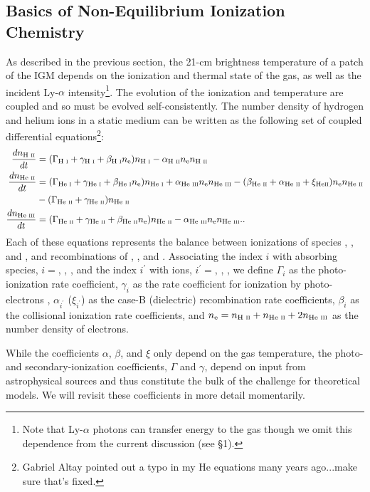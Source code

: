 \subsection{Basics of Non-Equilibrium Ionization Chemistry} \label{sec:ioniz_heating}
As described in the previous section, the 21-cm brightness temperature of a patch of the IGM depends on the ionization and thermal state of the gas, as well as the incident Ly-$\alpha$ intensity\footnote{Note that Ly-$\alpha$ photons can transfer energy to the gas though we omit this dependence from the current discussion (see \S1).}. The evolution of the ionization and temperature are coupled and so must be evolved self-consistently. The number density of hydrogen and helium ions in a static medium can be written as the following set of coupled differential equations\footnote{{\color{red} Gabriel Altay pointed out a typo in my He equations many years ago...make sure that's fixed.}}:
\begin{align}
    \frac{d n_{\text{H } \textsc{ii}}}{dt} & = (\Gamma_{\text{H } \textsc{i}} + \gamma_{\text{H } \textsc{i}} + \beta_{\text{H } \textsc{i}} n_{\text{e}}) n_{\text{H } \textsc{i}} - \alpha_{\text{H } \textsc{ii}} n_{\text{e}} n_{\text{H } \textsc{ii}}   \label{eq:HIIRateEquation} \\
    \frac{d n_{\text{He } \textsc{ii}}}{dt} & = (\Gamma_{\text{He } \textsc{i}} + \gamma_{\text{He } \textsc{i}} + \beta_{\text{He } \textsc{i}} n_{\text{e}}) n_{\text{He } \textsc{i}} \nonumber + \alpha_{\text{He } \textsc{iii}} n_{\text{e}} n_{\text{He } \textsc{iii}}  - (\beta_{\text{He } \textsc{ii}} + \alpha_{\text{He } \textsc{ii}} + \xi_{\text{He} \textsc{ii}}) n_{\text{e}} n_{\text{He } \textsc{ii}} \\ & - (\Gamma_{\text{He } \textsc{ii}} + \gamma_{\text{He } \textsc{ii}}) n_{\text{He } \textsc{ii}} \label{eq:HeIIRateEquation} \\ 
    \frac{d n_{\text{He } \textsc{iii}}}{dt} & = (\Gamma_{\text{He } \textsc{ii}} + \gamma_{\text{He } \textsc{ii}} + \beta_{\text{He } \textsc{ii}} n_{\text{e}}) n_{\text{He } \textsc{ii}}  - \alpha_{\text{He } \textsc{iii}} n_{\text{e}} n_{\text{He } \textsc{iii}} . \label{eq:HeIIIRateEquation} .
\end{align}
Each of these equations represents the balance between ionizations of species
\HI, \HeI, and \HeII, and recombinations of \HII, \HeII, and
\HeIII. Associating the index $i$ with absorbing species, $i = $\HI, \HeI,
\HeII, and the index $i^{\prime}$ with ions, $i^{\prime} = $\HII, \HeII,
\HeIII, we define $\Gamma_i$ as the photo-ionization rate coefficient,
$\gamma_i$ as the rate coefficient for ionization by photo-electrons \cite{Shull1985,Furlanetto2010}, $\alpha_{i^{\prime}}$
($\xi_{i^{\prime}}$) as the case-B (dielectric) recombination rate
coefficients, $\beta_i$ as the collisional ionization rate coefficients, and
$n_{\text{e}} = n_{\text{H } \textsc{ii}} + n_{\text{He } \textsc{ii}} + 2n_{\text{He } \textsc{iii}}$ as the number density of electrons.

While the coefficients $\alpha$, $\beta$, and $\xi$ only depend on the gas temperature, the photo- and secondary-ionization coefficients, $\Gamma$ and $\gamma$, depend on input from astrophysical sources and thus constitute the bulk of the challenge for theoretical models. We will revisit these coefficients in more detail momentarily.

